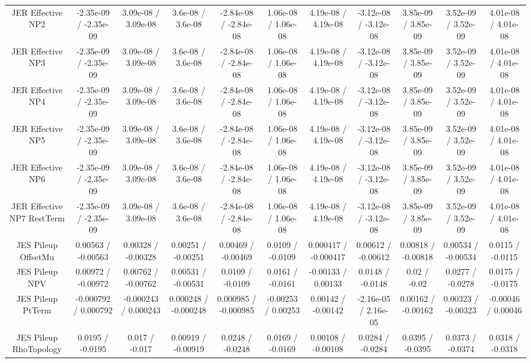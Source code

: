 \begin{table}[htbp]
\begin{center}
\begin{tabular}{|c|c|c|c|c|c|c|c|c|c|c|}
  JER Effective NP2 & -2.35e-09 / -2.35e-09 & 3.09e-08 / 3.09e-08 & 3.6e-08 / 3.6e-08 & -2.84e-08 / -2.84e-08 & 1.06e-08 / 1.06e-08 & 4.19e-08 / 4.19e-08 & -3.12e-08 / -3.12e-08 & 3.85e-09 / 3.85e-09 & 3.52e-09 / 3.52e-09 & 4.01e-08 / 4.01e-08 \\ 
  JER Effective NP3 & -2.35e-09 / -2.35e-09 & 3.09e-08 / 3.09e-08 & 3.6e-08 / 3.6e-08 & -2.84e-08 / -2.84e-08 & 1.06e-08 / 1.06e-08 & 4.19e-08 / 4.19e-08 & -3.12e-08 / -3.12e-08 & 3.85e-09 / 3.85e-09 & 3.52e-09 / 3.52e-09 & 4.01e-08 / 4.01e-08 \\ 
  JER Effective NP4 & -2.35e-09 / -2.35e-09 & 3.09e-08 / 3.09e-08 & 3.6e-08 / 3.6e-08 & -2.84e-08 / -2.84e-08 & 1.06e-08 / 1.06e-08 & 4.19e-08 / 4.19e-08 & -3.12e-08 / -3.12e-08 & 3.85e-09 / 3.85e-09 & 3.52e-09 / 3.52e-09 & 4.01e-08 / 4.01e-08 \\ 
  JER Effective NP5 & -2.35e-09 / -2.35e-09 & 3.09e-08 / 3.09e-08 & 3.6e-08 / 3.6e-08 & -2.84e-08 / -2.84e-08 & 1.06e-08 / 1.06e-08 & 4.19e-08 / 4.19e-08 & -3.12e-08 / -3.12e-08 & 3.85e-09 / 3.85e-09 & 3.52e-09 / 3.52e-09 & 4.01e-08 / 4.01e-08 \\ 
  JER Effective NP6 & -2.35e-09 / -2.35e-09 & 3.09e-08 / 3.09e-08 & 3.6e-08 / 3.6e-08 & -2.84e-08 / -2.84e-08 & 1.06e-08 / 1.06e-08 & 4.19e-08 / 4.19e-08 & -3.12e-08 / -3.12e-08 & 3.85e-09 / 3.85e-09 & 3.52e-09 / 3.52e-09 & 4.01e-08 / 4.01e-08 \\ 
  JER Effective NP7 RestTerm & -2.35e-09 / -2.35e-09 & 3.09e-08 / 3.09e-08 & 3.6e-08 / 3.6e-08 & -2.84e-08 / -2.84e-08 & 1.06e-08 / 1.06e-08 & 4.19e-08 / 4.19e-08 & -3.12e-08 / -3.12e-08 & 3.85e-09 / 3.85e-09 & 3.52e-09 / 3.52e-09 & 4.01e-08 / 4.01e-08 \\ 
  JES Pileup OffsetMu & 0.00563 / -0.00563 & 0.00328 / -0.00328 & 0.00251 / -0.00251 & 0.00469 / -0.00469 & 0.0109 / -0.0109 & 0.000417 / -0.000417 & 0.00612 / -0.00612 & 0.00818 / -0.00818 & 0.00534 / -0.00534 & 0.0115 / -0.0115 \\ 
  JES Pileup NPV & 0.00972 / -0.00972 & 0.00762 / -0.00762 & 0.00531 / -0.00531 & 0.0109 / -0.0109 & 0.0161 / -0.0161 & -0.00133 / 0.00133 & 0.0148 / -0.0148 & 0.02 / -0.02 & 0.0277 / -0.0278 & 0.0175 / -0.0175 \\ 
  JES Pileup PtTerm & -0.000792 / 0.000792 & -0.000243 / 0.000243 & 0.000248 / -0.000248 & 0.000985 / -0.000985 & -0.00253 / 0.00253 & 0.00142 / -0.00142 & -2.16e-05 / 2.16e-05 & 0.00162 / -0.00162 & 0.00323 / -0.00323 & -0.00046 / 0.00046 \\ 
  JES Pileup RhoTopology & 0.0195 / -0.0195 & 0.017 / -0.017 & 0.00919 / -0.00919 & 0.0248 / -0.0248 & 0.0169 / -0.0169 & 0.00108 / -0.00108 & 0.0284 / -0.0284 & 0.0395 / -0.0395 & 0.0373 / -0.0374 & 0.0318 / -0.0318 \\ 

\end{tabular}
\end{center}
\end{table}

